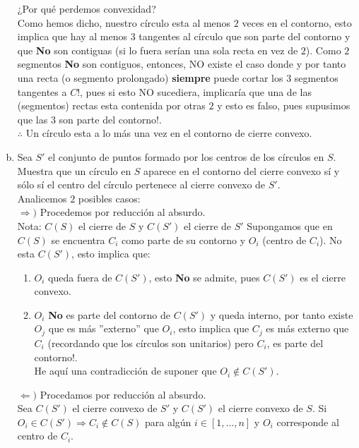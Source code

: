\begin{enumerate}[a)]
¿Por qué perdemos convexidad?\\
Como hemos dicho, nuestro círculo esta al menos $2$ veces en el contorno, esto implica que
hay al menos $3$ tangentes al círculo que son parte del contorno y que \textbf{No} son
contiguas (si lo fuera serían una sola recta en vez de $2$). Como $2$ segmentos \textbf{No}
son contiguos, entonces, NO existe el caso donde
y por tanto una recta (o segmento prolongado) \textbf{siempre} puede cortar los $3$ segmentos
tangentes a $C!$, pues si esto NO sucediera, implicaría que una de las (segmentos) rectas
esta contenida por otras $2$ y esto es falso, pues supusimos que las $3$ son parte del contorno$!$.\\
$\therefore$ Un círculo esta a lo más una vez en el contorno de cierre convexo.
 \item Sea $S'$ el conjunto de puntos formado por los centros de los círculos en $S$. 
 Muestra que un círculo en $S$ aparece en el contorno del cierre convexo sí y sólo sí 
 el centro del círculo pertenece al cierre convexo de $S'$.\\
 Analicemos $2$ posibles casos:\\
 $\Rightarrow )$ Procedemos por reducción al absurdo.\\
 Nota: $C(S)$ el cierre de $S$ y $C(S')$ el cierre de $S'$
 Supongamos que en $C(S)$ se encuentra $C_i$ como parte de su contorno y $O_i$ 
 (centro de $C_i$). No esta $C(S')$, esto implica que:

 \begin{enumerate}[1.]
     \item $O_i$ queda fuera de $C(S')$, esto \textbf{No} se admite, pues $C(S')$
     es el cierre convexo.
     \item $O_i$ \textbf{No} es parte del contorno de $C(S')$ y queda interno, por tanto
     existe $O_j$ que es más ''externo'' que $O_i$, esto implica que $C_j$ es más externo
     que $C_i$ (recordando que los círculos son unitarios) pero $C_i$, es parte del contorno$!$.\\
     He aquí una contradicción de suponer que $O_i\notin C(S')$.
 \end{enumerate}

$\Leftarrow)$ Procedamos por reducción al absurdo.\\
Sea $C(S')$ el cierre convexo de $S'$ y $C(S')$ el cierre convexo de $S$. 
Si $O_i\in C(S')\Rightarrow C_i\notin C(S)$ para algún $i\in [1,...,n]$ y 
$O_i$ corresponde al centro de $C_i$.\\


\end{enumerate}
